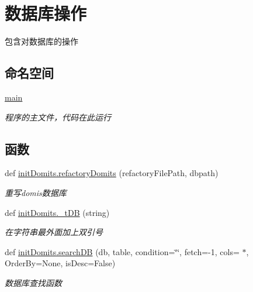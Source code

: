 \hypertarget{group___xE6_x95_xB0_xE6_x8D_xAE_xE5_xBA_x93_xE6_x93_x8D_xE4_xBD_x9C}{}\section{数据库操作}
\label{group___xE6_x95_xB0_xE6_x8D_xAE_xE5_xBA_x93_xE6_x93_x8D_xE4_xBD_x9C}


包含对数据库的操作  


\subsection*{命名空间}
\begin{DoxyCompactItemize}
\item 
 \mbox{\hyperlink{namespacemain}{main}}
\begin{DoxyCompactList}\small\item\em 程序的主文件，代码在此运行 \end{DoxyCompactList}\end{DoxyCompactItemize}
\subsection*{函数}
\begin{DoxyCompactItemize}
\item 
def \mbox{\hyperlink{group___xE6_x95_xB0_xE6_x8D_xAE_xE5_xBA_x93_xE6_x93_x8D_xE4_xBD_x9C_ga7cf18932eaa3e3b83f60132e1de06e82}{init\+Domits.\+refactory\+Domits}} (refactory\+File\+Path, dbpath)
\begin{DoxyCompactList}\small\item\em 重写domis数据库 \end{DoxyCompactList}\item 
def \mbox{\hyperlink{group___xE6_x95_xB0_xE6_x8D_xAE_xE5_xBA_x93_xE6_x93_x8D_xE4_xBD_x9C_gab6a167211fea45f940088aa25e470456}{init\+Domits.\+\_\+t\+DB}} (string)
\begin{DoxyCompactList}\small\item\em 在字符串最外面加上双引号 \end{DoxyCompactList}\item 
def \mbox{\hyperlink{group___xE6_x95_xB0_xE6_x8D_xAE_xE5_xBA_x93_xE6_x93_x8D_xE4_xBD_x9C_gab0b2210b38aa2decfc4f09e122f949bf}{init\+Domits.\+search\+DB}} (db, table, condition=\char`\"{}\char`\"{}, fetch=-\/1, cols=\textquotesingle{} $\ast$\textquotesingle{}, Order\+By=None, is\+Desc=False)
\begin{DoxyCompactList}\small\item\em 数据库查找函数 \end{DoxyCompactList}\end{DoxyCompactItemize}


